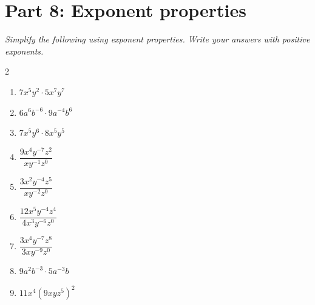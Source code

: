 \documentclass[11pt]{article}
\begin{document}
\section*{Part 8: Exponent properties}
\noindent\textit{Simplify the following using exponent properties. Write your answers with positive exponents.}
\begin{multicols}{2}
\begin{enumerate}
  \item $7x^{5} y^{2} \cdot 5x^{7} y^{7}$
  \vspace{1.8cm}
  \item $6a^{6} b^{-6} \cdot 9a^{-4} b^{6}$
  \vspace{1.8cm}
  \item $7x^{5} y^{6} \cdot 8x^{5} y^{5}$
  \vspace{1.8cm}
  \item $\dfrac{9x^{4} y^{-7} z^{2}}{x y^{-1} z^{0}}$
  \vspace{1.8cm}
  \item $\dfrac{3x^{2} y^{-4} z^{5}}{x y^{-2} z^{0}}$
  \vspace{1.8cm}
  \item $\dfrac{12x^{5} y^{-4} z^{4}}{4x^{3} y^{-6} z^{0}}$
  \vspace{1.8cm}
  \item $\dfrac{3x^{4} y^{-7} z^{8}}{3x y^{-9} z^{0}}$
  \vspace{1.8cm}
  \item $9a^{2} b^{-3} \cdot 5a^{-3} b$
  \vspace{1.8cm}
  \item $11x^{4}(9x y z^{5})^{2}$
  \vspace{1.8cm}
\end{enumerate}
\end{multicols}
\end{document}
